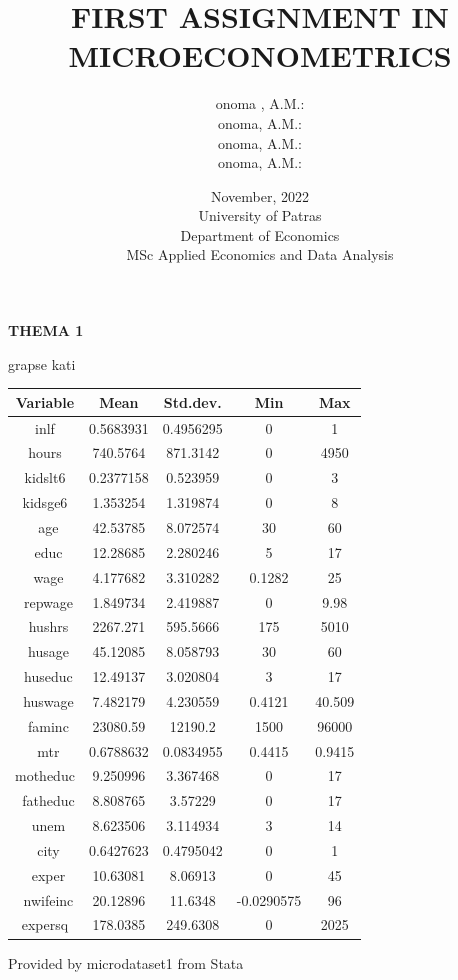 \documentclass{article}
\title{\textbf{FIRST ASSIGNMENT IN MICROECONOMETRICS}}
\author{onoma , A.M.: \\
	onoma, A.M.: \\
	onoma, A.M.: \\
	onoma, A.M.: }
\date{November, 2022\\
	University of Patras\\
	Department of Economics\\
	MSc Applied Economics and Data Analysis}
\begin{document}
	
	\centering
	\large{\textbf{THEMA 1}}
	
	\vspace {0.5\baselineskip}
	
	grapse kati
	
	
	
	 \label{tab:title} 
	
	\begin{tabular}{|c |c |c |c |c |}
		\toprule
		Variable & Mean & Std.dev. & Min & Max \\ 
		\midrule
		inlf & 0.5683931 & 0.4956295 & 0 & 1\\
		hours & 740.5764 & 871.3142 & 0 & 4950 \\
		kidslt6 & 0.2377158 & 0.523959 & 0 & 3\\
		kidsge6 & 1.353254 & 1.319874 & 0 & 8\\\
		age & 42.53785 & 8.072574 & 30 & 60\\\
		educ & 12.28685 & 2.280246 & 5 & 17\\\
		wage & 4.177682 & 3.310282  & 0.1282 & 25\\\
		repwage & 1.849734 & 2.419887 & 0 & 9.98\\\
		hushrs & 2267.271 & 595.5666 & 175 & 5010\\\
		husage & 45.12085 & 8.058793 & 30 & 60\\\
		huseduc & 12.49137 & 3.020804 & 3 & 17\\\
		huswage & 7.482179 & 4.230559 & 0.4121 & 40.509\\\
		faminc & 23080.59 & 12190.2 & 1500 & 96000\\\
		mtr & 0.6788632 & 0.0834955 & 0.4415 & 0.9415\\
		motheduc & 9.250996 & 3.367468 & 0 & 17\\\
		fatheduc & 8.808765 & 3.57229 & 0 & 17\\\
		unem & 8.623506 & 3.114934 & 3 & 14\\\
		city & 0.6427623 & 0.4795042 & 0 & 1\\\
		exper & 10.63081 & 8.06913 & 0 & 45\\\
		nwifeinc & 20.12896 & 11.6348 & -0.0290575 & 96\\
		expersq & 178.0385 & 249.6308 & 0 & 2025\\
		\bottomrule
		
	\end{tabular} \par
	Provided by microdataset1 from Stata
	
	\vspace {0.5\baselineskip}
	
\end{document}
